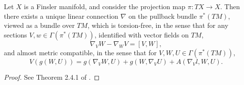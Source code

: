 \begin{prop}
  Let $X$ is a Finsler manifold, and consider the projection map $\pi: TX \to X$. Then there exists a unique linear connection $\nabla$ on the pullback bundle $\pi^*(TM)$, viewed as a bundle over $TM$, which is torsion-free, in the sense that for any sections $V,w \in \Gamma(\pi^*(TM))$, identified with vector fields on $TM$,
  \[ \nabla_V W - \nabla_W V = [V,W], \]
  and almost metric compatible, in the sense that for $V,W,U \in \Gamma(\pi^*(TM))$,
  \[ V(g(W,U)) = g(\nabla_V W, U) + g(W, \nabla_V U) + A(\nabla_V l, W, U). \]
\end{prop}
\begin{proof}
  See Theorem 2.4.1 of \cite{BaoChern}. %
\end{proof}

